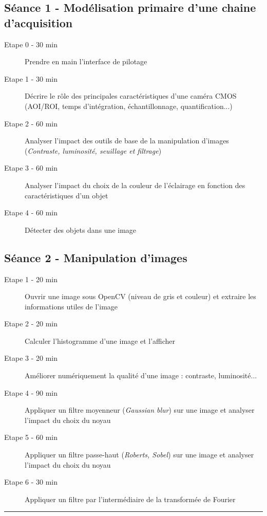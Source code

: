 \documentclass[a4paper,11pt,titlepage]{article} %
\begin{document}
\subsection{Séance 1 - Modélisation primaire d'une chaine d'acquisition}
\begin{description}
	\item[Etape 0 - 30 min] Prendre en main l'interface de pilotage
	\item[Etape 1 - 30 min] Décrire le rôle des principales caractéristiques d'une caméra CMOS (AOI/ROI, temps d'intégration, échantillonnage, quantification...) 
	\item[Etape 2 - 60 min] Analyser l'impact des outils de base de la manipulation d'images (\textit{Contraste, luminosité, seuillage et filtrage})
	\item[Etape 3 - 60 min] Analyser l'impact du choix de la couleur de l'éclairage en fonction des caractéristiques d'un objet
	\item[Etape 4 - 60 min] Détecter des objets dans une image
\end{description}
	
\subsection{Séance 2 - Manipulation d'images}
\begin{description}
	\item[Etape 1 - 20 min] Ouvrir une image sous OpenCV (niveau de gris et couleur) et extraire les informations utiles de l'image
	\item[Etape 2 - 20 min] Calculer l'histogramme d'une image et l'afficher
	\item[Etape 3 - 20 min] Améliorer numériquement la qualité d'une image : contraste, luminosité...
	\item[Etape 4 - 90 min] Appliquer un filtre moyenneur (\textit{Gaussian blur}) sur une image et analyser l'impact du choix du noyau
	\item[Etape 5 - 60 min] Appliquer un filtre passe-haut (\textit{Roberts, Sobel}) sur une image et analyser l'impact du choix du noyau
	\item[Etape 6 - 30 min] Appliquer un filtre par l'intermédiaire de la transformée de Fourier
\end{description}

\noindent \rule{\linewidth}{1pt}

\medskip



\newpage
\strut %
\end{document}
